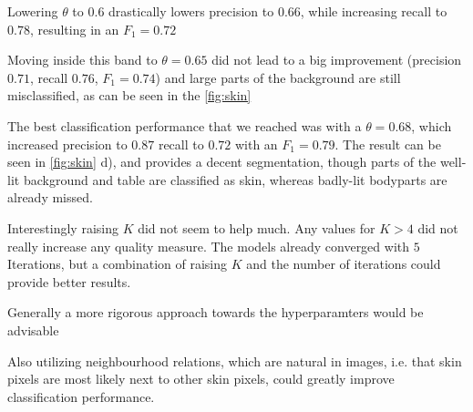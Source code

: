 \documentclass{scrartcl}
\begin{document}
Lowering $\theta$ to $0.6$ drastically lowers precision to $0.66$, while increasing recall to $0.78$, resulting in an $F_1=0.72$

Moving inside this band to $\theta=0.65$ did not lead to a big improvement (precision $0.71$, recall $0.76$, $F_1=0.74$) and large parts of the background are still misclassified, as can be seen in the \cref{fig:skin}

The best classification performance that we reached was with a $\theta=0.68$, which increased precision to $0.87$ recall to $0.72$ with an $F_1=0.79$.
The result can be seen in \cref{fig:skin} d), and provides a decent segmentation, though parts of the well-lit background and table are classified as skin, whereas badly-lit bodyparts are already missed.

Interestingly raising $K$ did not seem to help much. Any values for $K>4$ did not really increase any quality measure.
The models already converged with $5$ Iterations, but a combination of raising $K$ and the number of iterations could provide better results.

Generally a more rigorous approach towards the hyperparamters would be advisable

Also utilizing neighbourhood relations, which are natural in images, i.e. that skin pixels are most likely next to other skin pixels, could greatly improve classification performance.
\end{document}
